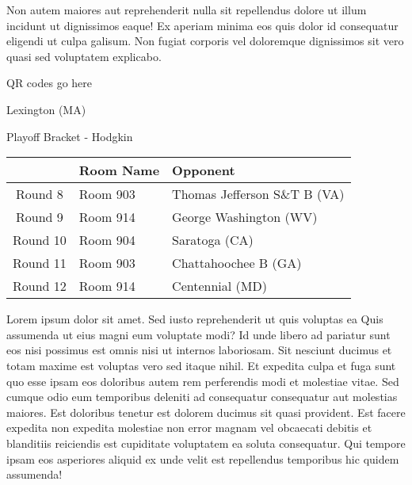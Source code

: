 \documentclass{article}%
\begin{document}
\newline%
Non autem maiores aut reprehenderit nulla sit repellendus dolore ut illum incidunt ut dignissimos eaque! Ex aperiam minima eos quis dolor id consequatur eligendi ut culpa galisum. Non fugiat corporis vel doloremque dignissimos sit vero quasi sed voluptatem explicabo.\newline%
\newline%
%
\vspace*{30pt}%
\begin{center}%
\begin{Huge}%
QR codes go here%
\end{Huge}%
\end{center}%
\newpage%
\begin{center}%
\begin{Huge}%
Lexington (MA)%
\end{Huge}%
\vspace*{8pt}%
\linebreak%
\begin{Large}%
Playoff Bracket {-} Hodgkin%
\end{Large}%
\end{center}%
\begin{tabularx}{\textwidth}{|c|Y|Y|}%
\hline%
&Room Name&Opponent\\%
\hline%
Round 8&Room 903&Thomas Jefferson S\&T B (VA)\\%
Round 9&Room 914&George Washington (WV)\\%
Round 10&Room 904&Saratoga (CA)\\%
Round 11&Room 903&Chattahoochee B (GA)\\%
Round 12&Room 914&Centennial (MD)\\%
\hline%
\end{tabularx}%
\vspace*{8pt}%
\linebreak%
\newline%
\newline%
Lorem ipsum dolor sit amet. Sed iusto reprehenderit ut quis voluptas ea Quis assumenda ut eius magni eum voluptate modi? Id unde libero ad pariatur sunt eos nisi possimus est omnis nisi ut internos laboriosam. Sit nesciunt ducimus et totam maxime est voluptas vero sed itaque nihil. Et expedita culpa et fuga sunt quo esse ipsam eos doloribus autem rem perferendis modi et molestiae vitae.\newline%
\newline%
Sed cumque odio eum temporibus deleniti ad consequatur consequatur aut molestias maiores. Est doloribus tenetur est dolorem ducimus sit quasi provident. Est facere expedita non expedita molestiae non error magnam vel obcaecati debitis et blanditiis reiciendis est cupiditate voluptatem ea soluta consequatur. Qui tempore ipsam eos asperiores aliquid ex unde velit est repellendus temporibus hic quidem assumenda!\newline%
\end{document}
